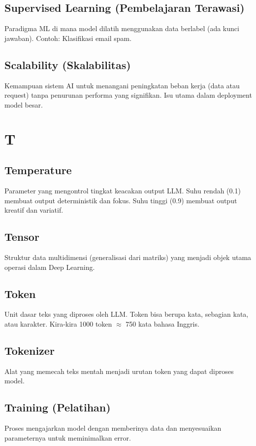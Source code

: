 \subsection*{Supervised Learning (Pembelajaran Terawasi)}
Paradigma ML di mana model dilatih menggunakan data berlabel (ada kunci jawaban). Contoh: Klasifikasi email spam.

\subsection*{Scalability (Skalabilitas)}
Kemampuan sistem AI untuk menangani peningkatan beban kerja (data atau request) tanpa penurunan performa yang signifikan. Isu utama dalam deployment model besar.

\section*{T}

\subsection*{Temperature}
Parameter yang mengontrol tingkat keacakan output LLM. Suhu rendah (0.1) membuat output deterministik dan fokus. Suhu tinggi (0.9) membuat output kreatif dan variatif.

\subsection*{Tensor}
Struktur data multidimensi (generalisasi dari matriks) yang menjadi objek utama operasi dalam Deep Learning.

\subsection*{Token}
Unit dasar teks yang diproses oleh LLM. Token bisa berupa kata, sebagian kata, atau karakter. Kira-kira 1000 token $\approx$ 750 kata bahasa Inggris.

\subsection*{Tokenizer}
Alat yang memecah teks mentah menjadi urutan token yang dapat diproses model.

\subsection*{Training (Pelatihan)}
Proses mengajarkan model dengan memberinya data dan menyesuaikan parameternya untuk meminimalkan error.

